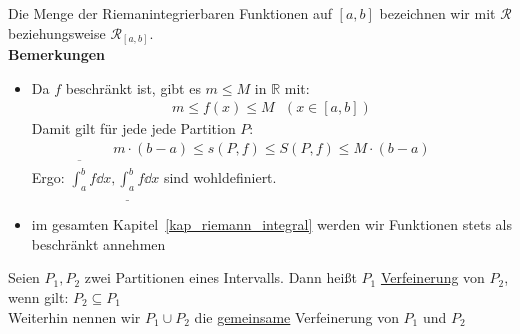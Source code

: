 \begin{Definition}
{	Die Menge der Riemanintegrierbaren Funktionen auf $[a,b]$ bezeichnen wir 
	mit $\mathcal{R}$ beziehungsweise $\mathcal{R}_{[a,b]}$.\\
	
	\textbf{Bemerkungen}
	\begin{itemize}
		\item Da $f$ beschränkt ist, gibt es $m \leq M$ in $\mathbb{R}$ mit:
		\begin{align*}
			m \leq f(x) \leq M \text{ }(x \in [a,b])
		\end{align*}
		Damit gilt für jede jede Partition $P$: 
		\begin{align*}
			m \cdot (b-a) \leq s(P,f) \leq S(P,f) \leq M \cdot (b-a)
		\end{align*}
		Ergo: $\overline{\int_a^b} f \dd{x} , \underline{\int_a^b} f \dd{x}$ 
		sind wohldefiniert.
		\item im gesamten Kapitel~\ref{kap_riemann_integral}
		werden wir Funktionen stets als 
		beschränkt annehmen
	\end{itemize}
	
}\end{Definition}

\begin{Definition}{
	Seien $P_1, P_2$ zwei Partitionen eines Intervalls. Dann heißt $P_1$ 
	\underline{Verfeinerung} von $P_2$, wenn gilt: $P_2 \subseteq P_1$ \\
	Weiterhin nennen wir $P_1 \cup P_2$ die \underline{gemeinsame} Verfeinerung 
	von $P_1$ und $P_2$
}\end{Definition}

